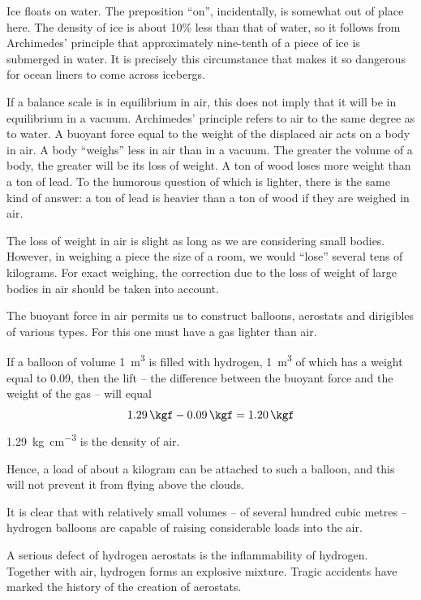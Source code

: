 Ice floats on water. The preposition ``on'', incidentally, is somewhat out of place here. The density of ice is about 10\% less than that of water, so it follows from Archimedes' principle that approximately nine-tenth of a piece of ice is submerged in water. It is precisely this circumstance that makes it so dangerous for ocean liners to come across icebergs.

If a balance scale is in equilibrium in air, this does not imply that it will be in equilibrium in a vacuum. Archimedes' principle refers to air to the same degree as to water. A buoyant force equal to the weight of the displaced air acts on a body in air. A body ``weighs'' less in air than in a vacuum. The greater the volume of a body, the greater will be its loss of weight. A ton of
wood loses more weight than a ton of lead. To the humorous question of which is lighter, there is the same kind
of answer: a ton of lead is heavier than a ton of wood if
they are weighed in air.

The loss of weight in air is slight as long as we are considering small bodies. However, in weighing a piece the size of a room, we would ``lose'' several tens of kilograms. For exact weighing, the correction due to the loss of weight of large bodies in air should be taken into account.

The buoyant force in air permits us to construct balloons, aerostats and dirigibles of various types. For this
one must have a gas lighter than air.

If a balloon of volume \SI{1}{\meter\cubed}  is filled with hydrogen, \SI{1}{\meter\cubed} of which has a weight equal to \SI{0.09}{\kgf}, then the lift -- the difference between the buoyant force and the weight of the gas -- will equal
\begin{equation*}%
\SI{1.29}{\kgf} - \SI{0.09}{\kgf} = \SI{1.20}{\kgf}
\end{equation*}
 \SI{1.29}{\kilo\gram\per\centi\metre\cubed} is the density of air.

Hence, a load of about a kilogram can be attached to such a balloon, and this will not prevent it from flying
above the clouds.

It is clear that with relatively small volumes -- of several hundred cubic metres -- hydrogen balloons are capable of raising considerable loads into the air.

A serious defect of hydrogen aerostats is the inflammability of hydrogen. Together with air, hydrogen forms
an explosive mixture. Tragic accidents have marked the history of the creation of aerostats.


